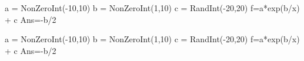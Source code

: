 \begin{sagesilent}
a = NonZeroInt(-10,10)
b = NonZeroInt(1,10)
c = RandInt(-20,20)
f=a*exp(b/x) + c
Ans=-b/2
\end{sagesilent}





\begin{sagesilent}
a = NonZeroInt(-10,10)
b = NonZeroInt(1,10)
c = RandInt(-20,20)
f=a*exp(b/x) + c
Ans=-b/2
\end{sagesilent}































